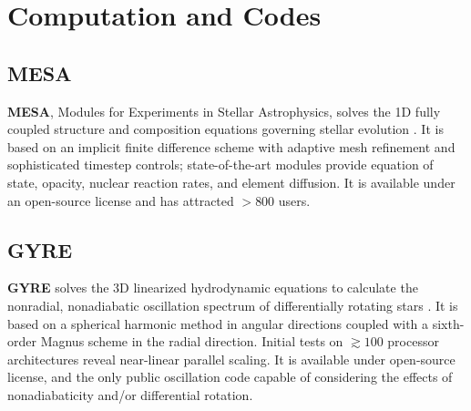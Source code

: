 \section{Computation and Codes}
    
    
{\color{green}    
\subsection{MESA}
}

\textbf{MESA}, Modules for Experiments in Stellar
Astrophysics, solves the 1D fully coupled structure and composition
equations governing stellar evolution \cite{Paxton2010,Paxton2013,Paxton2015}. It
is based on an implicit finite difference scheme with adaptive mesh
refinement and sophisticated timestep controls; 
state-of-the-art modules provide equation of state, opacity, nuclear
reaction rates, and element diffusion.
It is 
available under an open-source license and has  attracted $>800$ 
 users.

    
    
{\color{brown}    
\subsection{GYRE}}
 \textbf{GYRE} solves the 3D linearized hydrodynamic
equations to calculate the nonradial, nonadiabatic oscillation
spectrum of differentially rotating stars \cite{2013MNRAS.435.3406T}. It is based
on a spherical harmonic method in angular directions coupled with a
sixth-order Magnus scheme in the radial direction. Initial tests on
$\gtrsim 100$ processor architectures reveal near-linear parallel
scaling. It is available under open-source license, and the only public oscillation code capable of
considering the effects of nonadiabaticity and/or differential
rotation.
